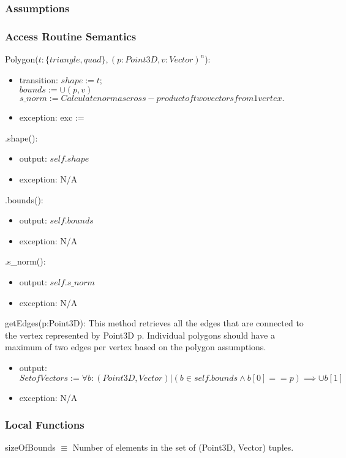 \documentclass[12pt, titlepage]{article}
\begin{document}
\subsubsection{Assumptions}

\subsubsection{Access Routine Semantics}
\noindent Polygon($t:\{triangle, quad\}, (p:Point3D, v:Vector)^n$):
\begin{itemize}
	\item transition: $shape := t;$ \\
	$bounds := \cup (p,v)$ \\
	$s\_norm := Calculate norm as cross-product of two vectors from 1 vertex.$
	\item exception: exc := \\
\end{itemize}

\noindent .shape():
\begin{itemize}
	\item output: $self.shape$
	\item exception: N/A
\end{itemize}

\noindent .bounds():
\begin{itemize}
	\item output: $self.bounds$
	\item exception: N/A
\end{itemize}

\noindent .s\_norm():
\begin{itemize}
	\item output: $self.s\_norm$
	\item exception: N/A
\end{itemize}

\noindent getEdges(p:Point3D):
This method retrieves all the edges that are connected to the vertex 
represented by Point3D p. Individual polygons should have a maximum of two 
edges per vertex based on the polygon assumptions.
\begin{itemize}
	\item output: $Set of Vectors := \forall b : (Point3D,Vector) | (b \in 
	self.bounds \wedge b[0] == p) \implies \cup b[1] $
	\item exception: N/A
\end{itemize}

\subsubsection{Local Functions}
sizeOfBounds $\equiv$ Number of elements in the set of (Point3D, Vector) 
tuples.\\
\end{document}
